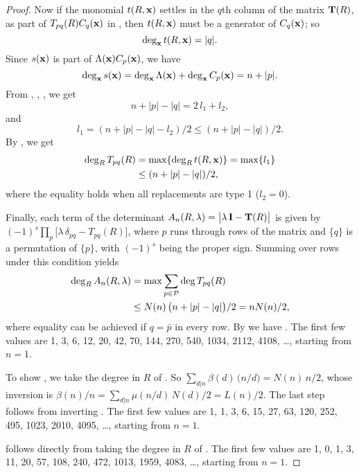 \documentclass[twocolumn]{revtex4-1}
\begin{document}
\begin{proof}
%
Now if the monomial $t(R, \mathbf{x})$ settles in the $q$th column of
  the matrix $\mathbf{T}(R)$, as part
  of $T_{pq}(R) C_q(\mathbf{x})$ in ,
then
  $t(R, \mathbf{x})$
  must be
  a generator of $C_q(\mathbf{x})$;
so
%
\begin{equation}
  \deg_{\mathbf{x}} t(R, \mathbf{x}) = |q|.
\label{eq:degxt}
\end{equation}
%
Since $s(\mathbf{x})$ is part of $\Lambda(\mathbf{x}) C_p(\mathbf{x})$,
  we have
%
\begin{equation}
  \deg_{\mathbf{x}} s(\mathbf{x}) = \deg_{\mathbf{x}} \Lambda(\mathbf{x}) + \deg_{\mathbf{x}} C_p(\mathbf{x})
  = n + |p|.
\label{eq:degxs}
\end{equation}
%
%
From , , , we get
\[
  n + |p| - |q| = 2 \, l_1 + l_2,
\]
and
\begin{equation}
  l_1  =    (n + |p| - |q| - l_2)/2
             \le  (n + |p| - |q|)/2.
\label{eq:l1limit}
\end{equation}
By , we get
\begin{align*}
  \deg_R T_{pq}(R)
  &= \max\{ \deg_R t(R, \mathbf{x}) \}
  = \max\{ l_1 \} \\
  &\le   (n + |p| - |q|)/2,
\end{align*}
where the equality holds when all replacements are type 1 ($l_2 = 0$).


Finally, each term of the determinant
$A_n(R, \lambda) = \big|\lambda \, \mathbf{I} - \mathbf{T}(R)\big|$
is given by
$(-1)^s \prod_{p} \big[\lambda \, \delta_{p q} - T_{pq}(R)\big]$,
where $p$ runs through rows of the matrix
  and $\{q\}$ is a permutation of $\{p\}$,
  with $(-1)^s$ being the proper sign.
Summing over rows under this condition yields
\begin{align*}
  \deg_R A_n(R, \lambda)
  &= \max \sum_{p \in \mathcal P} \deg T_{pq}(R) \\
  &\le N(n) \, \big(n + |p| - |q|\big)/2
  = n N(n)/2,
\end{align*}
where equality can be achieved if $q = \bar p$ in every row.
By  we have .
%
The first few values are 1, 3, 6, 12, 20, 42, 70, 144, 270, 540, 1034, 2112, 4108, \dots, starting from $n = 1$.



To show , we take the degree in $R$ of .
So $\sum_{d|n} \beta(d) \, \big(n/d\big) = N(n) \, n/2$,
whose inversion is
  $\beta(n)/n = \sum_{d|n} \mu(n/d) \, N(d)/2 = L(n)/2$.
The last step follows from inverting .
%
The first few values are 1, 1, 3, 6, 15, 27, 63, 120, 252, 495, 1023, 2010, 4095, \dots, starting from $n = 1$.

 follows directly from taking the degree in $R$ of .
The first few values are 1, 0, 1, 3, 11, 20, 57, 108, 240, 472, 1013, 1959, 4083, \dots, starting from $n = 1$.
\end{proof}
\end{document}

